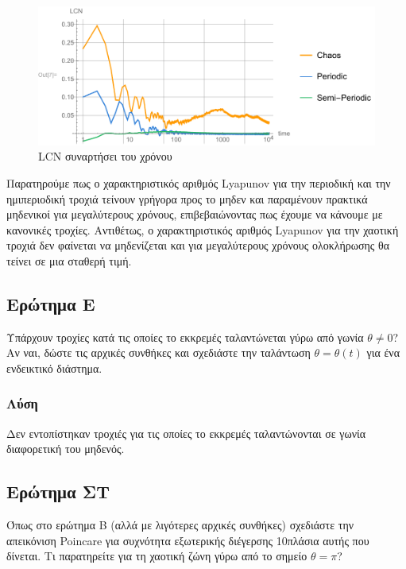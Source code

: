 \documentclass{article}
\begin{document}
\begin{figure}[H]
    \centering
    \includegraphics{AD_Pend_4/LCN_combined.pdf}
    \caption{\textlatin{LCN} συναρτήσει του χρόνου}
    \label{fig:LCN_combined}
\end{figure}

Παρατηρούμε πως ο χαρακτηριστικός αριθμός \textlatin{Lyapunov} για την περιοδική και την ημιπεριοδική τροχιά τείνουν γρήγορα προς το μηδεν και παραμένουν πρακτικά μηδενικοί για μεγαλύτερους χρόνους, επιβεβαιώνοντας πως έχουμε να κάνουμε με κανονικές τροχίες. Αντιθέτως, ο χαρακτηριστικός αριθμός \textlatin{Lyapunov} για την χαοτική τροχιά δεν φαίνεται να μηδενίζεται και για μεγαλύτερους χρόνους ολοκλήρωσης θα τείνει σε μια σταθερή τιμή.

\subsection{Ερώτημα Ε}

\indent Υπάρχουν τροχίες κατά τις οποίες το εκκρεμές ταλαντώνεται γύρω από γωνία \(\theta \neq 0\)? Αν ναι, δώστε τις αρχικές συνθήκες και σχεδιάστε την ταλάντωση \(\theta=\theta(t)\) για ένα ενδεικτικό διάστημα.

\subsubsection{Λύση}

\indent Δεν εντοπίστηκαν τροχιές για τις οποίες το εκκρεμές ταλαντώνονται σε γωνία διαφορετική του μηδενός.

\subsection{Ερώτημα ΣΤ}

\indent Όπως στο ερώτημα Β (αλλά με λιγότερες αρχικές συνθήκες) σχεδιάστε την απεικόνιση \textlatin{Poincare} για συχνότητα εξωτερικής διέγερσης 10πλάσια αυτής που δίνεται. Τι παρατηρείτε για τη χαοτική ζώνη γύρω από το σημείο \(\theta=\pi\)?
\end{document}

